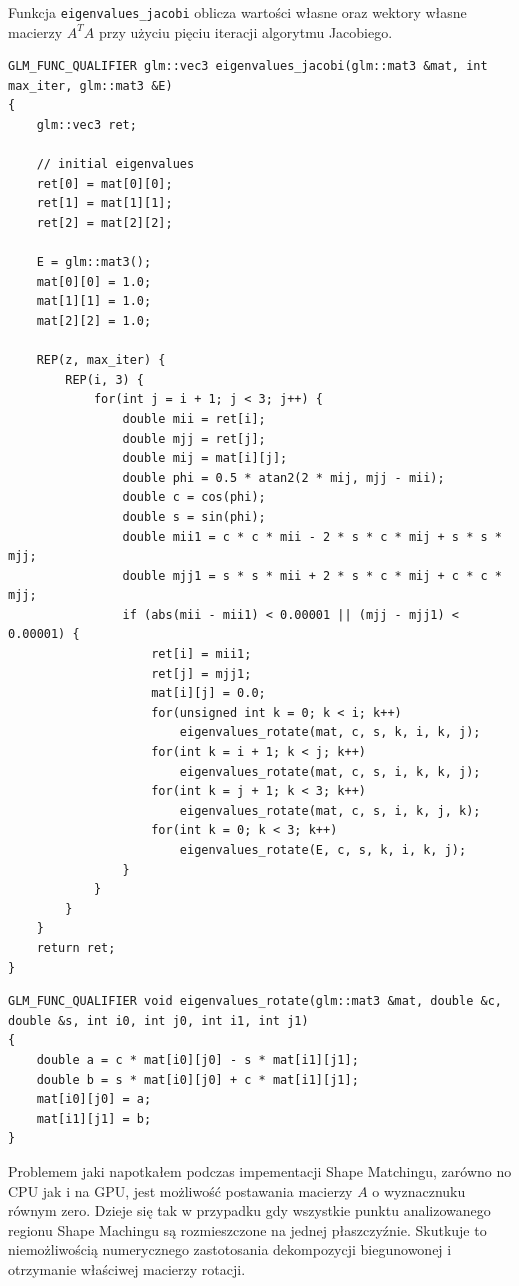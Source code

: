 {Funkcja \texttt{eigenvalues\_jacobi} oblicza wartości własne oraz wektory własne
macierzy $A^T A$ przy użyciu pięciu iteracji algorytmu Jacobiego. 

\begin{lstlisting}[caption=Algorytm wyznaczania wartości i wektorów własnych
	macierzy,label=eigenvalues]
GLM_FUNC_QUALIFIER glm::vec3 eigenvalues_jacobi(glm::mat3 &mat, int max_iter, glm::mat3 &E)
{
	glm::vec3 ret;

	// initial eigenvalues
	ret[0] = mat[0][0];
	ret[1] = mat[1][1];
	ret[2] = mat[2][2];

	E = glm::mat3();
	mat[0][0] = 1.0;
	mat[1][1] = 1.0;
	mat[2][2] = 1.0;

	REP(z, max_iter) {
		REP(i, 3) {
			for(int j = i + 1; j < 3; j++) {
				double mii = ret[i];
				double mjj = ret[j];
				double mij = mat[i][j];
				double phi = 0.5 * atan2(2 * mij, mjj - mii);
				double c = cos(phi);
				double s = sin(phi);
				double mii1 = c * c * mii - 2 * s * c * mij + s * s * mjj;
				double mjj1 = s * s * mii + 2 * s * c * mij + c * c * mjj;
				if (abs(mii - mii1) < 0.00001 || (mjj - mjj1) < 0.00001) {
					ret[i] = mii1;
					ret[j] = mjj1;
					mat[i][j] = 0.0;
					for(unsigned int k = 0; k < i; k++)
						eigenvalues_rotate(mat, c, s, k, i, k, j);
					for(int k = i + 1; k < j; k++)
						eigenvalues_rotate(mat, c, s, i, k, k, j);
					for(int k = j + 1; k < 3; k++)
						eigenvalues_rotate(mat, c, s, i, k, j, k);
					for(int k = 0; k < 3; k++)
						eigenvalues_rotate(E, c, s, k, i, k, j);
				}
			}
		}
	}
	return ret;
}
\end{lstlisting}

\begin{lstlisting}[caption=Algorytm dekompozycji biegunowej
	macierzy,label=eigen-rotate]
GLM_FUNC_QUALIFIER void eigenvalues_rotate(glm::mat3 &mat, double &c, double &s, int i0, int j0, int i1, int j1)
{
	double a = c * mat[i0][j0] - s * mat[i1][j1];
	double b = s * mat[i0][j0] + c * mat[i1][j1];
	mat[i0][j0] = a;
	mat[i1][j1] = b;
}
\end{lstlisting}

Problemem jaki napotkałem podczas impementacji Shape Matchingu, zarówno no CPU
jak i na GPU, jest możliwość postawania macierzy $A$ o wyznacznuku równym zero.
Dzieje się tak w przypadku gdy wszystkie punktu analizowanego regionu Shape
Machingu są rozmieszczone na jednej płaszczyźnie. Skutkuje to niemożliwością
numerycznego zastotosania dekompozycji biegunowonej i otrzymanie właściwej
macierzy rotacji.

}
